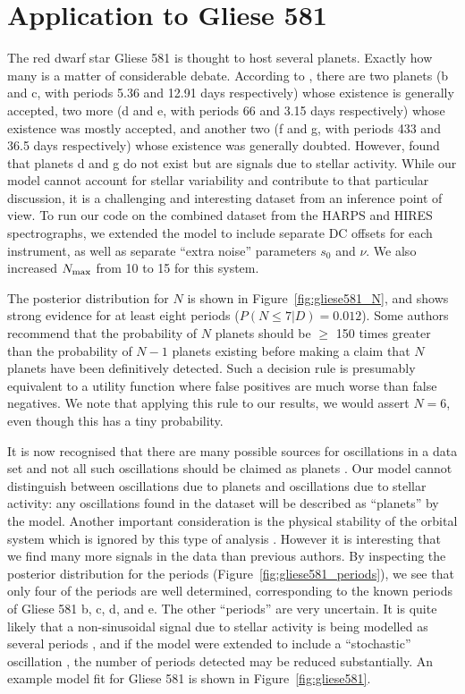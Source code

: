 \documentclass[useAMS,usenatbib]{mn2e}
\begin{document}
\section{Application to Gliese 581}
The red dwarf star Gliese 581 is thought to host several planets. Exactly
how many is a matter of considerable debate. According to
\citet{2014Sci...345..440R}, there are two planets
(b and c, with periods 5.36 and 12.91 days respectively)
whose existence is generally
accepted, two more
(d and e, with periods 66 and 3.15 days respectively)
whose existence was mostly accepted, and another two
(f and g, with periods 433 and 36.5 days respectively)
whose existence was generally doubted. However, \citet{2014Sci...345..440R}
found that planets d and g do not exist but are signals due to stellar activity.
While our model cannot account for stellar variability and contribute to that
particular discussion, it is a challenging and interesting dataset from an
inference point of view.
To run our code on the combined dataset from the HARPS and HIRES spectrographs,
we extended the model to include separate DC offsets for each instrument, as
well as separate ``extra noise'' parameters $s_0$ and $\nu$. We also increased
$N_{\rm max}$ from 10 to 15 for this system.

The posterior distribution for $N$ is shown in Figure~\ref{fig:gliese581_N},
and shows strong evidence for at least eight periods
($P(N \leq 7 | D) = 0.012$). Some authors \citep[e.g.][]{2011A&A...528L...5T}
recommend that the probability of $N$ planets should be $\geq$ 150 times
greater than the probability of $N-1$ planets existing before making a
claim that $N$ planets have been definitively detected. Such a decision rule
is presumably equivalent to a utility function where false positives are much
worse than false negatives. We note that applying this rule to our results, we
would assert $N=6$, even though this has a tiny probability.

It is now recognised that
there are many possible sources for oscillations in a data set and not all
such oscillations should be claimed as planets \citep{2014Sci...345..440R}. 
Our model cannot distinguish between oscillations due to planets and
oscillations due to stellar activity: any oscillations found in the dataset
will be described as ``planets'' by the model. Another important consideration
is the physical stability of the orbital system which is ignored by this type
of analysis \citep{orbital}. However it is interesting that
we find many more signals in the data than previous authors.
By inspecting the posterior distribution for the periods
(Figure~\ref{fig:gliese581_periods}), we see that only four of the periods
are well determined, corresponding to the known periods of Gliese 581 b, c, d,
and e. The other ``periods'' are very uncertain. It is quite likely that a
non-sinusoidal signal due to stellar activity is being modelled as several
periods \citep{astero}, and if the model were extended to include a ``stochastic''
oscillation \citep{gaussproc}, the number of periods detected may be reduced
substantially. An example model fit for Gliese 581 is shown in
Figure~\ref{fig:gliese581}.
\end{document}
